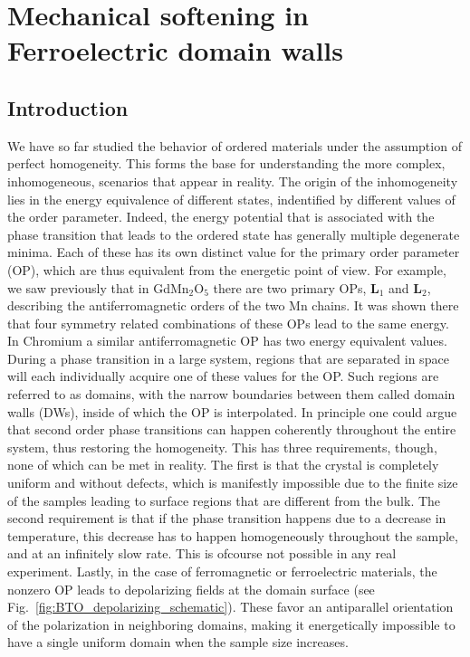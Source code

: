 \chapter{Mechanical softening in Ferroelectric domain walls}


\section{Introduction}
We have so far studied the behavior of ordered materials under the assumption of perfect homogeneity.
This forms the base for understanding the more complex, inhomogeneous, scenarios that appear in reality.
The origin of the inhomogeneity lies in the energy equivalence of different states, indentified by different values of the order parameter.
Indeed, the energy potential that is associated with the phase transition that leads to the ordered state has generally multiple degenerate minima.
Each of these has its own distinct value for the primary order parameter (OP), which are thus equivalent from the energetic point of view.
For example, we saw previously that in GdMn$_2$O$_5$ there are two primary OPs, $\bm{L}_1$ and $\bm{L}_2$, describing the antiferromagnetic orders of the two Mn chains.
It was shown there that four symmetry related combinations of these OPs lead to the same energy.
In Chromium a similar antiferromagnetic OP has two energy equivalent values.
During a phase transition in a large system, regions that are separated in space will each individually acquire one of these values for the OP.
Such regions are referred to as domains, with the narrow boundaries between them called domain walls (DWs), inside of which the OP is interpolated.
In principle one could argue that second order phase transitions can happen coherently throughout the entire system, thus restoring the homogeneity.
This has three requirements, though, none of which can be met in reality.
The first is that the crystal is completely uniform and without defects, which is manifestly impossible due to the finite size of the samples leading to surface regions that are different from the bulk.
The second requirement is that if the phase transition happens due to a decrease in temperature, this decrease has to happen homogeneously throughout the sample, and at an infinitely slow rate.
This is ofcourse not possible in any real experiment.
Lastly, in the case of ferromagnetic or ferroelectric materials, the nonzero OP leads to depolarizing fields at the domain surface (see Fig.~\ref{fig:BTO_depolarizing_schematic}).
These favor an antiparallel orientation of the polarization in neighboring domains, making it energetically impossible to have a single uniform domain when the sample size increases.
